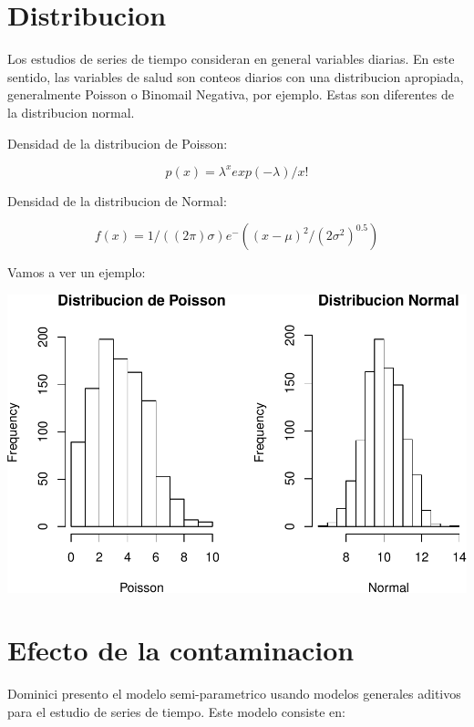 \documentclass[]{book}
\begin{document}
\hypertarget{distribucion}{%
\section{Distribucion}\label{distribucion}}

Los estudios de series de tiempo consideran en general variables diarias. En este sentido, las variables de salud son conteos diarios con una distribucion apropiada, generalmente Poisson o Binomail Negativa, por ejemplo. Estas son diferentes de la distribucion normal.

Densidad de la distribucion de Poisson:

\begin{equation}
p(x) = \lambda^x exp(-\lambda)/x!
\label{eq:12}
\end{equation}

Densidad de la distribucion de Normal:

\begin{equation}
f(x) = 1/( (2 \pi) \sigma) e^-((x - \mu)^2/(2 \sigma^2)^0.5 )
\label{eq:13}
\end{equation}

Vamos a ver un ejemplo:

\includegraphics[height=1.5\textheight]{bookdown-demo_files/figure-latex/unnamed-chunk-38-1}

\hypertarget{efecto-de-la-contaminacion}{%
\section{Efecto de la contaminacion}\label{efecto-de-la-contaminacion}}

Dominici presento el modelo semi-parametrico usando modelos generales aditivos \citep{gam} para el estudio de series de tiempo. Este modelo consiste en:
\end{document}
